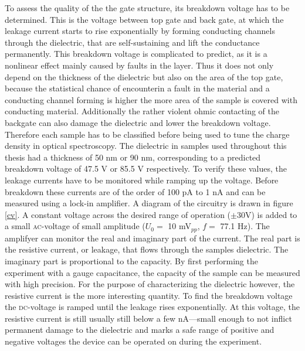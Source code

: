 To assess the quality of the the gate structure, its breakdown voltage has to be determined. This is the voltage between top gate and back gate, at which the leakage current starts to rise exponentially by forming conducting channels through the dielectric, that are self-sustaining and lift the conductance permanently\cite{klein_maximum_1966}. This breakdown voltage is complicated to predict, as it is a nonlinear effect mainly caused by faults in the \sio layer. Thus it does not only depend on the thickness of the dielectric but also on the area of the top gate, because the statistical chance of encounterin a fault in the material and a conducting channel forming is higher the more area of the sample is covered with conducting material. Additionally the rather violent ohmic contacting of the backgate can also damage the dielectric and lower the breakdown voltage. Therefore each sample has to be classified before being used to tune the charge density in optical spectroscopy. The dielectric in samples used throughout this thesis had a thickness of 50 nm or 90 nm, corresponding to a predicted breakdown voltage of 47.5 V or 85.5 V respectively. To verify these values, the leakage currents have to be monitored while ramping up the voltage. Before breakdown these currents are of the order of 100 pA to 1 nA and can be measured using a lock-in amplifier. A diagram of the circuitry is drawn in figure \ref{cv}. A constant voltage across the desired range of operation ({\small$\pm $}30V) is added to a small \textsc{ac}-voltage of small amplitude ($U_0 = $ 10 mV$_{pp}$, $f = $ 77.1 Hz). The amplifyer can monitor the real and imaginary part of the current. The real part is the resistive current, or leakage, that flows through the samples dielectric. The imaginary part is proportional to the capacity. By first performing the experiment with a gauge capacitance, the capacity of the sample can be measured with high precision. For the purpose of characterizing the dielectric however, the resistive current is the more interesting quantity. To find the breakdown voltage the \textsc{dc}-voltage is ramped until the leakage rises exponentially. At this voltage, the resistive current is still usually still below a few nA---small enough to not inflict permanent damage to the dielectric and marks a safe range of positive and negative voltages the device can be operated on during the experiment.

